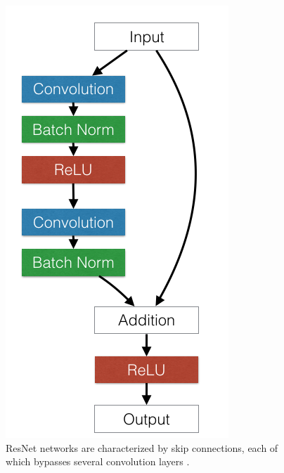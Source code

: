 \begin{figure}
\centering
\includegraphics[width=0.4\columnwidth]{img/resnet}
\caption{
ResNet networks are characterized by skip connections, each of which bypasses several convolution layers \cite{gross2016training}.}
\label{fig:resnet}
\end{figure}